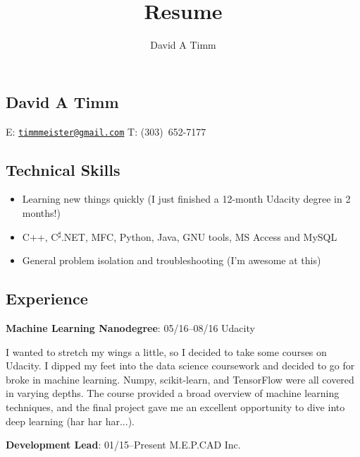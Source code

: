 \documentclass[letterpaper,12pt]{article}
\author{David A Timm}
\title{Resume}
\begin{document}
\begin{center}
\section{David A Timm}

E: \href{mailto:timmmeister@gmail.com?subject=You%27re%20hired!}
{\nolinkurl{timmmeister@gmail.com}}
T: \mbox{(303) 652-7177}
\end{center}

\begin{center}
\subsection{Technical Skills}
\end{center}

\begin{itemize}
\item Learning new things quickly (I just finished a 12-month Udacity degree in 2 months!)
\item C++, C\textsuperscript{{$\sharp$}}.NET, MFC, Python, Java, GNU tools, MS Access and MySQL
\item General problem isolation and troubleshooting (I'm awesome at this)
\end{itemize}

\begin{center}
\subsection{Experience}
\end{center}

\begin{flushleft}
\textbf{Machine Learning Nanodegree}: 05/16--08/16 Udacity
\end{flushleft}

I wanted to stretch my wings a little, so I decided to take some courses on
Udacity. I dipped my feet into the data science coursework and decided to go
for broke in machine learning. Numpy, scikit-learn, and TensorFlow were all
covered in varying depths. The course provided a broad overview of machine
learning techniques, and the final project gave me an excellent opportunity to
dive into deep learning (har har har...).

\begin{flushleft}
\textbf{Development Lead}: 01/15--Present M.E.P.CAD Inc.
\end{flushleft}
\end{document}
